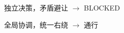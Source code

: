 \begin{subfigure}[b]{0.48\textwidth}
  \centering
  \caption{独立决策，矛盾避让 $\to$ BLOCKED}
\end{subfigure}\hfill
\begin{subfigure}[b]{0.48\textwidth}
  \centering
  \caption{全局协调，统一右绕 $\to$ 通行}
\end{subfigure}
